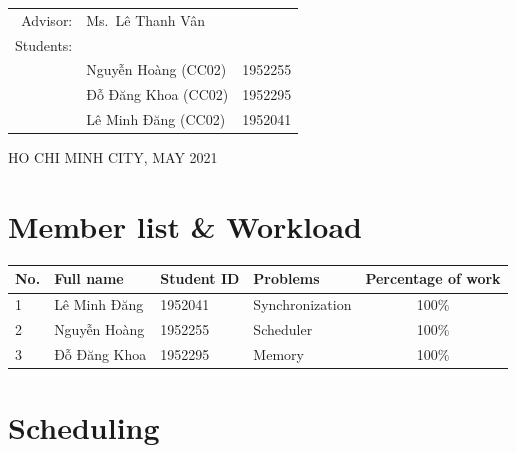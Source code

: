 \documentclass[a4paper]{article}
\numberwithin{equation}{section}
\begin{document}
\begin{titlepage}
  \begin{table}[h]
    \begin{tabular}{rll}
      \hspace{1cm} Advisor:  & Ms.\ Lê Thanh Vân             \\
      \hspace{1cm} Students: &                               \\
                             & Nguyễn Hoàng (CC02) & 1952255 \\
                             & Đỗ Đăng Khoa (CC02) & 1952295 \\
                             & Lê Minh Đăng (CC02) & 1952041 \\
    \end{tabular}
  \end{table}

  \begin{center}
    {\footnotesize HO CHI MINH CITY, MAY 2021}
  \end{center}
\end{titlepage}



\newpage
\tableofcontents
\newpage

\section*{Member list \& Workload}
\begin{center}
  \begin{tabular}{llllc}
    \toprule
    \textbf{No.} & \textbf{Full name} & \textbf{Student ID} & \textbf{Problems} & \textbf{Percentage of work} \\
    \midrule
    1            & Lê Minh Đăng       & 1952041             & Synchronization   & 100\%                       \\
    2            & Nguyễn Hoàng       & 1952255             & Scheduler         & 100\%                       \\
    3            & Đỗ Đăng Khoa       & 1952295             & Memory            & 100\%                       \\
    \bottomrule
  \end{tabular}
\end{center}

\newpage
\section{Scheduling}
\end{document}
